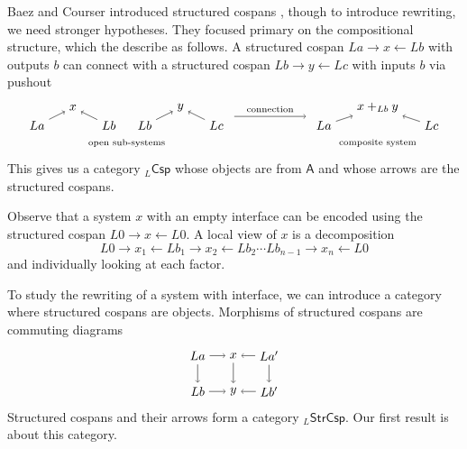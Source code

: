 \documentclass{amsart}
\newcommand{\A}{\cat{A}}
\newcommand{\Csp}{\cat{Csp}}
\newcommand{\StrCsp}{\cat{StrCsp}}
\newcommand{\cat}[1]{\mathsf{#1}}
\renewcommand{\gets}{\leftarrow}
\theoremstyle{remark}
\theoremstyle{definition}
\begin{document}
Baez and Courser introduced structured cospans
\cite{StrCsp}, though to introduce rewriting, we need
stronger hypotheses.  They focused primary on the
compositional structure, which the describe as follows. A
structured cospan $ La \to x \gets Lb $ with outputs $ b $
can connect with a structured cospan $ Lb \to y \gets Lc $
with inputs $ b $ via pushout
%
\[
  \begin{tikzpicture}
    \begin{scope}
      \node (1) at (0,0) {$ La $};
      \node (2) at (1,0.5) {$ x $};
      \node (3) at (2,0) {$ Lb $};
      \node (4) at (3,0) {$ Lb $};
      \node (5) at (4,0.5) {$ y $};
      \node (6) at (5,0) {$ Lc $};
      \draw [->] (1) to node [] {\scriptsize{$  $}} (2);
      \draw [->] (3) to node [] {\scriptsize{$  $}} (2);
      \draw [->] (4) to node [] {\scriptsize{$  $}} (5);
      \draw [->] (6) to node [] {\scriptsize{$  $}} (5);
      \node () at (2.5,-0.5) {\scriptsize{open sub-systems}};
    \end{scope}
    \begin{scope}[shift={(8,0)}]
      \node (1) at (0,0) {$ La $};
      \node (2) at (1.5,0.5) {$ x +_{Lb} y $};
      \node (3) at (3,0) {$ Lc $};
      \draw [->] (1) to node [] {\scriptsize{$  $}} (2);
      \draw [->] (3) to node [] {\scriptsize{$  $}} (2);
      \node () at (1.5,-0.5) {\scriptsize{composite system}};
    \end{scope}
    \draw [->] (5.5,0.25) to node [above] {\scriptsize{connection}} (7.5,0.25);    
  \end{tikzpicture}
\]
% 
This gives us a category $ _{L}\Csp $ whose objects are from
$ \A $ and whose arrows are the structured cospans.

Observe that a system $ x $ with an empty interface can be
encoded using the structured cospan $ L0 \to x \gets L0 $.
A local view of $ x $ is a decomposition
%
\[
  L0 \to x_1 \gets Lb_1 \to x_2 \gets Lb_2 \dotsm Lb_{n-1} \to x_n
  \gets L0
\]
% 
and individually looking at each factor.
    
To study the rewriting of a system with interface,
we can introduce a category where structured cospans are
objects. Morphisms of structured cospans are commuting diagrams
%
\begin{equation} \label{eq:StrCsp-arrows}
\raisebox{-4.5ex}{
  \begin{tikzpicture}
    \node (1t) at (0,1) {$ La $};
    \node (2t) at (1,1) {$ x $};
    \node (3t) at (2,1) {$ La' $};
    \node (1b) at (0,0) {$ Lb $};
    \node (2b) at (1,0) {$ y $};
    \node (3b) at (2,0) {$ Lb' $};
    \draw [->] (1t) to node [] {\scriptsize{$  $}} (2t);
    \draw [->] (3t) to node [] {\scriptsize{$  $}} (2t);
    \draw [->] (1b) to node [] {\scriptsize{$  $}} (2b);
    \draw [->] (3b) to node [] {\scriptsize{$  $}} (2b);
    \draw [->] (1t) to node [] {\scriptsize{$  $}} (1b);
    \draw [->] (2t) to node [] {\scriptsize{$  $}} (2b);
    \draw [->] (3t) to node [] {\scriptsize{$  $}} (3b);
  \end{tikzpicture}
}
\end{equation}
%
Structured cospans and their arrows form a category
$ _{L}\StrCsp $.  Our first result is about this category.
\end{document}
